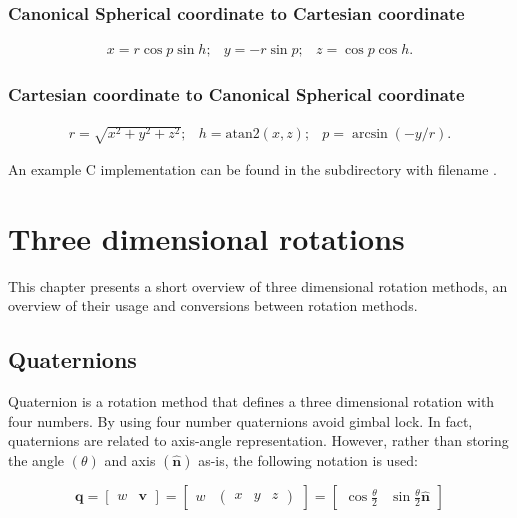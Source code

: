 \documentclass[a4paper,11pt]{article}
\begin{document}
\subsubsection{Canonical Spherical coordinate to Cartesian coordinate}

$$
\begin{array}{lcr}
x=r\cos p \sin h; & y=-r\sin p; & z=\cos p \cos h.
\end{array}
$$

\subsubsection{Cartesian coordinate to Canonical Spherical coordinate}

$$
\begin{array}{lcr}
r=\sqrt{x^2+y^2+z^2}; & h=\text{atan2}(x,z); & p=\arcsin(-y/r).
\end{array}
$$

An example C implementation can be found in the  subdirectory with filename .


\newpage
\section{Three dimensional rotations}

This chapter presents a short overview of three dimensional rotation methods, an overview of their usage and conversions between rotation methods.

\subsection{Quaternions}

Quaternion is a rotation method that defines a three dimensional rotation with four numbers. By using four number quaternions avoid gimbal lock. In fact, quaternions are related to axis-angle representation. However, rather than storing the angle $(\theta)$ and axis $(\hat{\textbf{n}})$ as-is, the following notation is used:

$$
\textbf{q}=\begin{bmatrix}
	w & \textbf{v}
\end{bmatrix}=\begin{bmatrix}
	w & \begin{pmatrix}
		x & y & z
	\end{pmatrix}
\end{bmatrix}=\begin{bmatrix}
	\cos\frac{\theta}{2} & \sin\frac{\theta}{2}\hat{\textbf{n}}
\end{bmatrix}
$$
\end{document}
